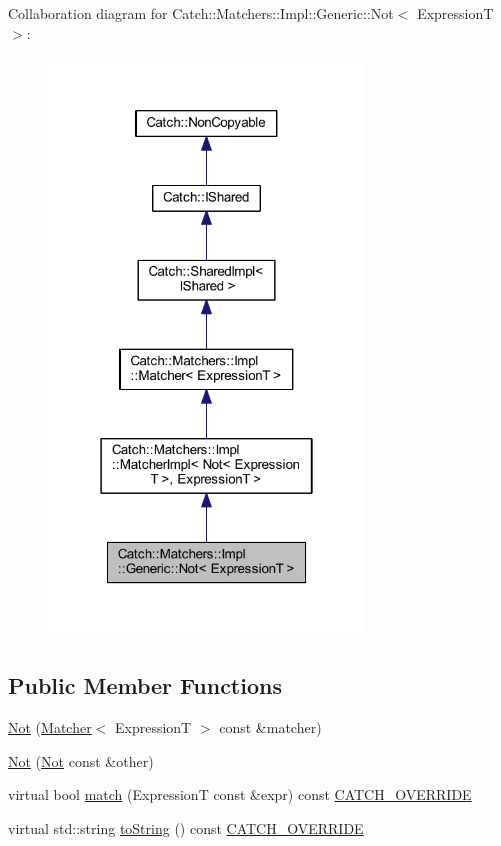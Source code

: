Collaboration diagram for Catch\+:\+:Matchers\+:\+:Impl\+:\+:Generic\+:\+:Not$<$ ExpressionT $>$\+:\nopagebreak
\begin{figure}[H]
\begin{center}
\leavevmode
\includegraphics[width=238pt]{class_catch_1_1_matchers_1_1_impl_1_1_generic_1_1_not__coll__graph}
\end{center}
\end{figure}
\subsection*{Public Member Functions}
\begin{DoxyCompactItemize}
\item 
\hyperlink{class_catch_1_1_matchers_1_1_impl_1_1_generic_1_1_not_a9b99e3ce49c1a16931708b67c312f204}{Not} (\hyperlink{struct_catch_1_1_matchers_1_1_impl_1_1_matcher}{Matcher}$<$ ExpressionT $>$ const \&matcher)
\item 
\hyperlink{class_catch_1_1_matchers_1_1_impl_1_1_generic_1_1_not_a46eccbbaeec259d3536aa2a29f95208f}{Not} (\hyperlink{class_catch_1_1_matchers_1_1_impl_1_1_generic_1_1_not}{Not} const \&other)
\item 
virtual bool \hyperlink{class_catch_1_1_matchers_1_1_impl_1_1_generic_1_1_not_a18c49fc6fb73a42d54650dafc18c7db1}{match} (ExpressionT const \&expr) const \hyperlink{catch_8hpp_a8ecdce4d3f57835f707915ae831eb847}{C\+A\+T\+C\+H\+\_\+\+O\+V\+E\+R\+R\+I\+DE}
\item 
virtual std\+::string \hyperlink{class_catch_1_1_matchers_1_1_impl_1_1_generic_1_1_not_ab970a4a6e58a987451e0b0e0e60a0bff}{to\+String} () const \hyperlink{catch_8hpp_a8ecdce4d3f57835f707915ae831eb847}{C\+A\+T\+C\+H\+\_\+\+O\+V\+E\+R\+R\+I\+DE}
\end{DoxyCompactItemize}
